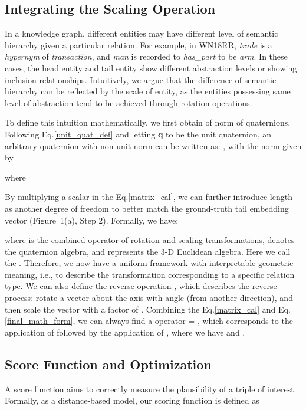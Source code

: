 \documentclass[11pt]{article}
\begin{document}
\subsection{Integrating the Scaling Operation}

In a knowledge graph, different entities may have different level of semantic hierarchy given a particular relation. For example, in WN18RR, \textit{trade} is a \textit{hypernym} of \textit{transaction}, and \textit{man} is recorded to \textit{has\_part} to be \textit{arm}. In these cases, the head entity and tail entity show different abstraction levels or showing inclusion relationships. Intuitively, we argue that the difference of semantic hierarchy can be reflected by the scale of entity, as the entities possessing same level of abstraction tend to be achieved through rotation operations.

To define this intuition mathematically, we first obtain of norm of quaternions. Following Eq.\ref{unit_quat_def} and letting \textbf{q} to be the unit quaternion, an arbitrary quaternion with non-unit norm can be written as: , with the norm given by

\noindent where 

By multiplying a scalar  in the Eq.\ref{matrix_cal}, we can further introduce length as another degree of freedom to better match the ground-truth tail embedding vector (Figure~1(a), Step 2). Formally, we have:

\noindent where  is the combined operator of rotation and scaling transformations,  denotes the quaternion algebra, and  represents the 3-D Euclidean algebra. Here we call  the . Therefore, we now have a uniform framework with  interpretable geometric meaning, i.e.,  to describe the transformation corresponding to a specific relation type.
We can also define the reverse operation , which describes the reverse process: rotate a vector about the axis  with angle  (from another direction), and then scale the vector with a factor of . Combining the Eq.\ref{matrix_cal} and Eq.\ref{final_math_form}, we can always find a operator  = , which corresponds to the application of  followed by the application of , where we have  and .

\subsection{Score Function and Optimization}
A score function aims to correctly measure the plausibility of a triple of interest. Formally, as a distance-based model, our scoring function is defined as 
\end{document}
